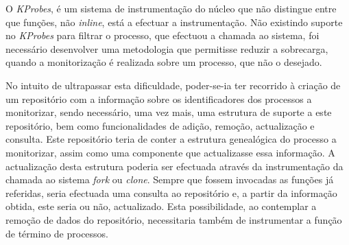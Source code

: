



O \textit{KProbes}, é um sistema de instrumentação do núcleo que não distingue entre que funções, não \textit{inline}, está a efectuar a instrumentação.
Não existindo suporte no \textit{KProbes} para filtrar o processo, que efectuou a chamada ao sistema, foi necessário desenvolver uma metodologia que permitisse reduzir a sobrecarga, quando a monitorização é realizada sobre um processo, que não o desejado.




No intuito de ultrapassar esta dificuldade, poder-se-ia ter recorrido à criação de um repositório com a informação sobre os identificadores dos processos a monitorizar, sendo necessário, uma vez mais, uma estrutura de suporte a este repositório, bem como funcionalidades de adição, remoção, actualização e consulta.
Este repositório teria de conter a estrutura genealógica do processo a monitorizar, assim como uma componente que actualizasse essa informação.
A actualização desta estrutura poderia ser efectuada através da instrumentação da chamada ao sistema \textit{fork} ou \textit{clone}.
Sempre que fossem invocadas as funções já referidas, seria efectuada uma consulta ao repositório e, a partir da informação obtida, este seria ou não, actualizado.
Esta possibilidade, ao contemplar a remoção de dados do repositório, necessitaria também de instrumentar a função de término de processos.

